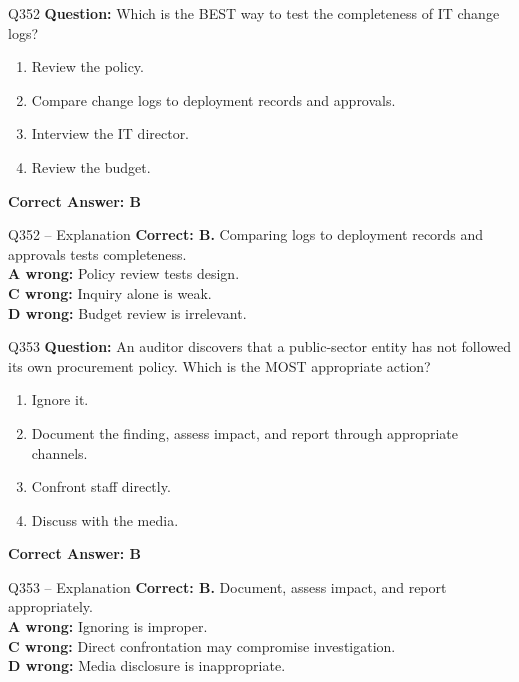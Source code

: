 \documentclass[aspectratio=169,10pt]{beamer}
\begin{document}
	\begin{frame}[t]{Q352}
		\small
		\textbf{Question:} Which is the BEST way to test the completeness of IT change logs?
		\begin{enumerate}[label=\Alph*.,itemsep=1pt,topsep=2pt]
			\item Review the policy.
			\item Compare change logs to deployment records and approvals.
			\item Interview the IT director.
			\item Review the budget.
		\end{enumerate}
		\vspace{4pt}
		\textbf{Correct Answer: B}
	\end{frame}
	
	\begin{frame}[t]{Q352 -- Explanation}
		\small
		\textbf{Correct: B.} Comparing logs to deployment records and approvals tests completeness. \\[4pt]
		\textbf{A wrong:} Policy review tests design. \\[2pt]
		\textbf{C wrong:} Inquiry alone is weak. \\[2pt]
		\textbf{D wrong:} Budget review is irrelevant.
	\end{frame}
	
	\begin{frame}[t]{Q353}
		\small
		\textbf{Question:} An auditor discovers that a public-sector entity has not followed its own procurement policy. Which is the MOST appropriate action?
		\begin{enumerate}[label=\Alph*.,itemsep=1pt,topsep=2pt]
			\item Ignore it.
			\item Document the finding, assess impact, and report through appropriate channels.
			\item Confront staff directly.
			\item Discuss with the media.
		\end{enumerate}
		\vspace{4pt}
		\textbf{Correct Answer: B}
	\end{frame}
	
	\begin{frame}[t]{Q353 -- Explanation}
		\small
		\textbf{Correct: B.} Document, assess impact, and report appropriately. \\[4pt]
		\textbf{A wrong:} Ignoring is improper. \\[2pt]
		\textbf{C wrong:} Direct confrontation may compromise investigation. \\[2pt]
		\textbf{D wrong:} Media disclosure is inappropriate.
	\end{frame}
	
\end{document}
